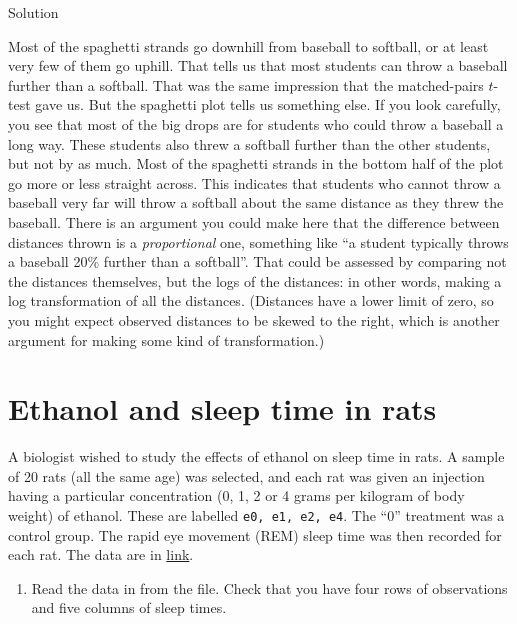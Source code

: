 \documentclass[]{tufte-book}
\providecommand{\tightlist}{%
  \setlength{\itemsep}{0pt}\setlength{\parskip}{0pt}}
\theoremstyle{definition}
\theoremstyle{definition}
\theoremstyle{definition}
\theoremstyle{remark}
\begin{document}
Solution

Most of the spaghetti strands go downhill from baseball to softball, or
at least very few of them go uphill. That tells us that most students
can throw a baseball further than a softball. That was the same
impression that the matched-pairs \(t\)-test gave us. But the spaghetti
plot tells us something else. If you look carefully, you see that most
of the big drops are for students who could throw a baseball a long way.
These students also threw a softball further than the other students,
but not by as much. Most of the spaghetti strands in the bottom half of
the plot go more or less straight across. This indicates that students
who cannot throw a baseball very far will throw a softball about the
same distance as they threw the baseball. There is an argument you could
make here that the difference between distances thrown is a
\emph{proportional} one, something like ``a student typically throws a
baseball 20\% further than a softball''. That could be assessed by
comparing not the distances themselves, but the logs of the distances:
in other words, making a log transformation of all the distances.
(Distances have a lower limit of zero, so you might expect observed
distances to be skewed to the right, which is another argument for
making some kind of transformation.)

\hypertarget{ethanol-and-sleep-time-in-rats}{%
\section{Ethanol and sleep time in
rats}\label{ethanol-and-sleep-time-in-rats}}

A biologist wished to study the effects of ethanol on sleep time in
rats. A sample of 20 rats (all the same age) was selected, and each rat
was given an injection having a particular concentration (0, 1, 2 or 4
grams per kilogram of body weight) of ethanol. These are labelled
\texttt{e0,\ e1,\ e2,\ e4}. The ``0'' treatment was a control group. The
rapid eye movement (REM) sleep time was then recorded for each rat. The
data are in
\href{http://www.utsc.utoronto.ca/~butler/c32/ratsleep.txt}{link}.

\begin{enumerate}
\def\labelenumi{(\alph{enumi})}
\tightlist
\item
  Read the data in from the file. Check that you have four rows of
  observations and five columns of sleep times.
\end{enumerate}
\end{document}
